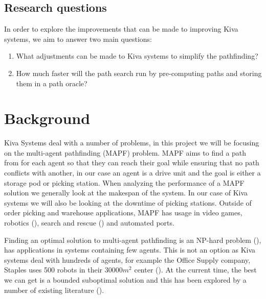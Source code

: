 \documentclass[a4paper,11pt]{article}
\begin{document}
\subsection{Research questions}
In order to explore the improvements that can be made to improving Kiva systems, we aim to answer two main questions:

\begin{enumerate}
	\item What adjustments can be made to Kiva systems to simplify the pathfinding?

\item How much faster will the path search run by pre-computing paths and storing them in a path oracle?

\end{enumerate}

\section{Background}

Kiva Systems deal with a number of problems, in this project we will be focusing on the multi-agent pathfinding (MAPF) problem. MAPF aims to find a path from for each agent so that they can reach their goal while ensuring that no path conflicts with another, in our case an agent is a drive unit and the goal is either a storage pod or picking station. When analyzing the performance of a MAPF solution we generally look at the makespan of the system. In our case of Kiva systems we will also be looking at the downtime of picking stations. Outside of order picking and warehouse applications,  MAPF has usage in video games, robotics (\cite{bennewitz2002finding}), search and rescue (\cite{konolige2006centibots}) and automated ports.

Finding an optimal solution to multi-agent pathfinding is an NP-hard problem (\cite{yu2013structure}), has applications in systems containing few agents. This is not an option as Kiva systems deal with hundreds of agents, for example the Office Supply company, Staples uses 500 robots in their 30000$m^{2}$ center (\cite{guizzo2008three}). At the current time, the best we can get is a bounded suboptimal solution and this has been explored by a number of existing literature (\cite{cohen2016bounded}).
\end{document}
